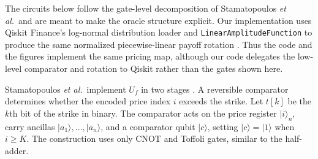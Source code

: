 \documentclass[12pt]{article}
\begin{document}
The circuits below follow the gate-level decomposition of Stamatopoulos \textit{et al.}\ and are meant to make the oracle structure explicit.  Our implementation uses Qiskit Finance's log-normal distribution loader and \texttt{LinearAmplitudeFunction} to produce the same normalized piecewise-linear payoff rotation \cite{qiskitFinanceSoftware}.  Thus the code and the figures implement the same pricing map, although our code delegates the low-level comparator and rotation to Qiskit rather than the gates shown here. 

Stamatopoulos \textit{et al.}\ implement $U_f$ in two stages \cite{stamatopoulosOptionPricingUsing2020}. A reversible comparator determines whether the encoded price index $i$ exceeds the strike.  Let $t[k]$ be the $k$th bit of the strike in binary.  The comparator acts on the price register $\lvert i\rangle_n$, carry ancillas $\lvert a_1\rangle,\ldots,\lvert a_n\rangle$, and a comparator qubit $\lvert c\rangle$, setting $\lvert c\rangle=\lvert 1\rangle$ when $i\ge K$.  The construction uses only CNOT and Toffoli gates, similar to the half-adder.
\end{document}
